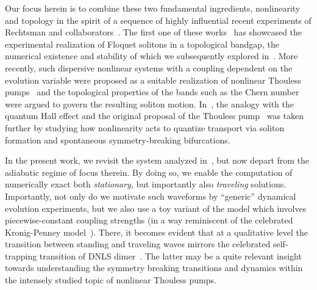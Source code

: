 \documentclass[reprint, amsmath,amssymb,aps,pre]{revtex4-2}
\begin{document}
Our focus herein is to combine these two
fundamental ingredients, nonlinearity and
topology in the spirit of a sequence of
highly influential recent experiments 
of Rechtsman and collaborators~\cite{Mukherjee2020,recht21,PhysRevLett.128.113901,Jurgensen2021}. The first one of these works~\cite{Mukherjee2020} has showcased the 
experimental realization of Floquet 
solitons in a topological bandgap, the numerical
existence and stability of which we subsequently
explored in~\cite{PhysRevE.105.044211}. More recently,
such dispersive nonlinear systems
with a coupling dependent on the evolution variable
were proposed as a suitable realization of nonlinear
Thouless pumps~\cite{PhysRevLett.128.113901} and the
topological  properties of the bands such as the Chern
number were argued to govern the resulting soliton motion.
In~\cite{Jurgensen2021}, the analogy with the quantum
Hall effect and the original proposal of the Thouless
pump~\cite{PhysRevB.27.6083} was taken further
by studying how
nonlinearity acts to quantize transport via soliton formation and spontaneous symmetry-breaking bifurcations.

In the present work, we revisit the system analyzed
in~\cite{Jurgensen2021}, but now depart from the 
adiabatic regime of focus therein. 
By doing so, we enable the computation of numerically
exact both {\it stationary}, but importantly also {\it traveling}
solutions. Importantly, not only do we motivate such waveforms
by ``generic'' dynamical evolution experiments, but we also use
a toy variant of the model which involves piecewise-constant
coupling strengths (in a way reminiscent of the celebrated
Kronig-Penney model~\cite{kronig}). There, it becomes evident
that at a qualitative level the transition between standing and
traveling waves mirrors the celebrated self-trapping transition
of DNLS dimer~\cite{Kenkre1986}. The latter may be a quite relevant
insight towards understanding the symmetry breaking transitions
and dynamics within the intensely studied topic of nonlinear Thouless
pumps. 
\end{document}
